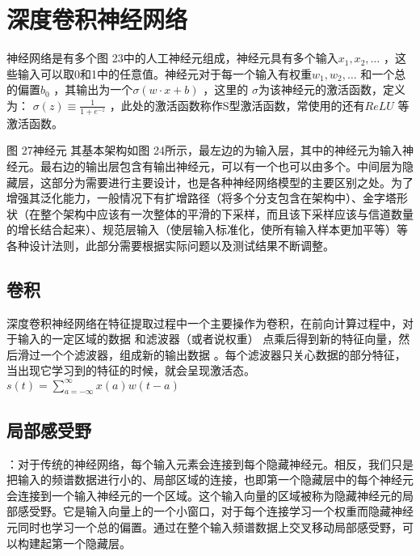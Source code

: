 \section{深度卷积神经网络}
神经网络是有多个图 23中的人工神经元组成，神经元具有多个输入$x_1,x_2,\dots $ ，这些输入可以取0和1中的任意值。神经元对于每一个输入有权重$w_1,w_2,\dots $ 和一个总的偏置$b_0$ ，其输出为一个$\sigma(w\cdot x + b)$ ，这里的 $\sigma$为该神经元的激活函数，定义为：
$\sigma(z)\equiv\frac{1}{1+e^{-z}}$
，此处的激活函数称作S型激活函数，常使用的还有$ReLU $ 等激活函数。

图 27神经元
其基本架构如图 24所示，最左边的为输入层，其中的神经元为输入神经元。最右边的输出层包含有输出神经元，可以有一个也可以由多个。中间层为隐藏层，这部分为需要进行主要设计，也是各种神经网络模型的主要区别之处。为了增强其泛化能力，一般情况下有扩增路径（将多个分支包含在架构中）、金字塔形状（在整个架构中应该有一次整体的平滑的下采样，而且该下采样应该与信道数量的增长结合起来）、规范层输入（使层输入标准化，使所有输入样本更加平等）等各种设计法则，此部分需要根据实际问题以及测试结果不断调整。

\subsection{卷积}
深度卷积神经网络在特征提取过程中一个主要操作为卷积，在前向计算过程中，对于输入的一定区域的数据 和滤波器（或者说权重） 点乘后得到新的特征向量，然后滑过一个个滤波器，组成新的输出数据 。每个滤波器只关心数据的部分特征，当出现它学习到的特征的时候，就会呈现激活态。
$s(t)=\sum_{a=-\infty}^{\infty}x(a)w(t-a) $
\subsection{局部感受野}
：对于传统的神经网络，每个输入元素会连接到每个隐藏神经元。相反，我们只是把输入的频谱数据进行小的、局部区域的连接，也即第一个隐藏层中的每个神经元会连接到一个输入神经元的一个区域。这个输入向量的区域被称为隐藏神经元的局部感受野。它是输入向量上的一个小窗口，对于每个连接学习一个权重而隐藏神经元同时也学习一个总的偏置。通过在整个输入频谱数据上交叉移动局部感受野，可以构建起第一个隐藏层。
